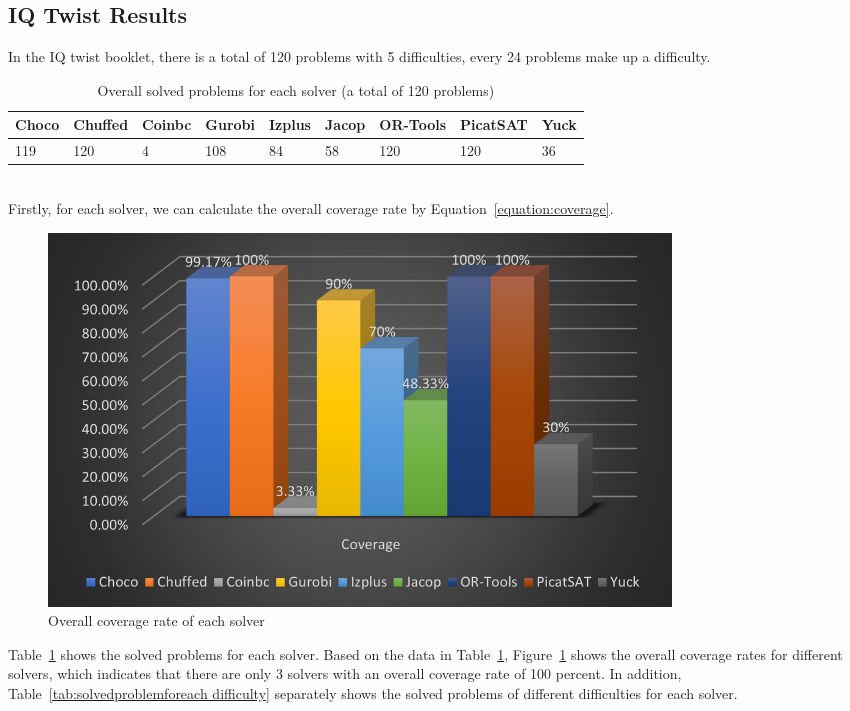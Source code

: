 \subsection{IQ Twist Results}
\label{sec:IQtwistresults}
In the IQ twist booklet, there is a total of 120 problems with 5 difficulties, every 24 problems make up a difficulty. 
\begin{table}[htbp]
\centering
\caption{Overall solved problems for each solver (a total of 120 problems)}
\label{tab:solvedproblem}
\begin{tabular}{|l|l|l|l|l|l|l|l|l|}
\hline
Choco & Chuffed & Coinbc& Gurobi & Izplus&Jacop& OR-Tools& PicatSAT&Yuck \\
\hline
119   &120      & 4     & 108    &84     &58   &120    &120      &36\\
\hline
\end{tabular}
\end{table}
\\Firstly, for each solver, we can calculate the overall coverage rate by Equation~\ref{equation:coverage}.
\begin{figure}[H]
     \centering
    \includegraphics[width=0.8\textwidth]{figs/coverage.png}
    \caption{Overall coverage rate of each solver}
    \label{eva2}
\end{figure}
Table~\ref{tab:solvedproblem} shows the solved problems for each solver. Based on the data in Table~\ref{tab:solvedproblem},
Figure~\ref{eva2} shows the overall coverage rates for different solvers, which indicates that there are only 3 solvers with an overall coverage rate of 100 percent.
In addition, Table~\ref{tab:solvedproblemforeach difficulty} separately shows the solved problems of different difficulties for each solver. 
